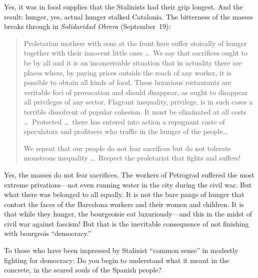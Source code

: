 Yes, it was in food supplies that the Stalinists had their grip long\-est. And the result: hunger, yes, actual hunger stalked Catalonia. The bitterness of the masses breaks through in \emph{Solidaridad Obrera\indexSolidaridadObrera} (September~19):

\begin{quotation}
  Proletarian mothers with sons at the front here suffer stoically of hunger together with their innocent little ones \dots\
  We say that sacrifices ought to be by all and it is an inconceivable situation that in actuality there are places where, by paying prices outside the reach of any worker, it is possible to obtain all kinds of food. These luxurious restaurants are veritable foci of provocation and should disappear, as ought to disappear all privileges of any sector. Flagrant inequality, privilege, is in such cases a terrible dissolvent of popular cohesion. It must be eliminated at all costs \dots\ Protected \dots\ there has entered into action a repugnant caste of speculators and profiteers who traffic in the hunger of the people\dots
  
  We repeat that our people do not fear sacrifices but do not tolerate monstrous inequality \dots\ Respect the proletariat that fights and suffers!
\end{quotation}

Yes, the masses do not fear sacrifices. The workers of Petrograd suffered the most extreme privations---not even running water in the city during the civil war. But what there was belonged to all equally. It is not the bare pangs of hunger that contort the faces of the Barcelona workers and their women and children. It is that while they hunger, the bourgeoisie eat luxuriously---and this in the midst of civil war against fascism! But that is the inevitable consequence of not finishing with bourgeois ``democracy.''

To those who have been impressed by Stalinist ``common sense'' in modestly fighting for democracy: Do you begin to understand what it meant in the concrete, in the seared souls of the Spanish people?
